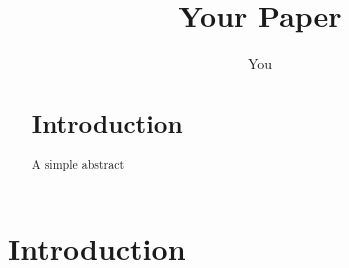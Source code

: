 \section{Introduction}\documentclass{article}
\title{Your Paper}
\author{You}
\begin{document}
\maketitle
\begin{abstract}
\section{Introduction}
A simple abstract
\end{abstract}




\end{document}
